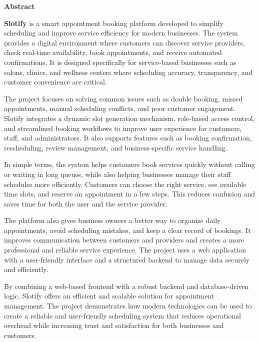 \thispagestyle{empty}
\newpage
\cleardoublepage{}
{}
\begin{center}
{\Large \bf Abstract}\\
\end{center}
\vspace{10pt}

\textbf{Slotify} is a smart appointment booking platform developed to simplify scheduling and improve service efficiency for modern businesses. The system provides a digital environment where customers can discover service providers, check real-time availability, book appointments, and receive automated confirmations. It is designed specifically for service-based businesses such as salons, clinics, and wellness centers where scheduling accuracy, transparency, and customer convenience are critical.

The project focuses on solving common issues such as double booking, missed appointments, manual scheduling conflicts, and poor customer engagement. Slotify integrates a dynamic slot generation mechanism, role-based access control, and streamlined booking workflows to improve user experience for customers, staff, and administrators. It also supports features such as booking confirmation, rescheduling, review management, and business-specific service handling.

In simple terms, the system helps customers book services quickly without calling or waiting in long queues, while also helping businesses manage their staff schedules more efficiently. Customers can choose the right service, see available time slots, and reserve an appointment in a few steps. This reduces confusion and saves time for both the user and the service provider.

The platform also gives business owners a better way to organize daily appointments, avoid scheduling mistakes, and keep a clear record of bookings. It improves communication between customers and providers and creates a more professional and reliable service experience. The project uses a web application with a user-friendly interface and a structured backend to manage data securely and efficiently.

By combining a web-based frontend with a robust backend and database-driven logic, Slotify offers an efficient and scalable solution for appointment management. The project demonstrates how modern technologies can be used to create a reliable and user-friendly scheduling system that reduces operational overhead while increasing trust and satisfaction for both businesses and customers.